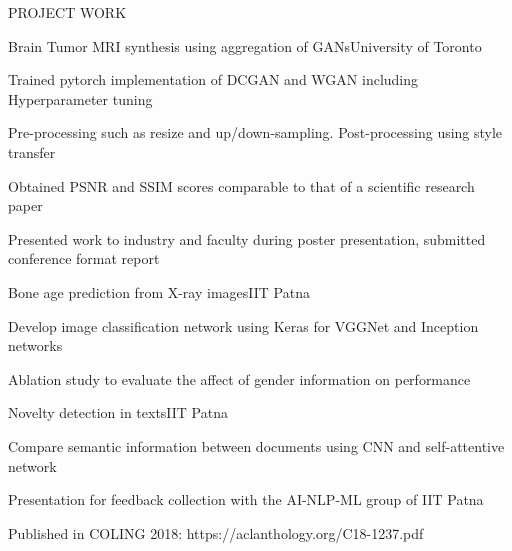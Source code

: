 \documentclass{resume}
\begin{document}
  \begin{rSection}{PROJECT WORK}

    \begin{rSubsection}{Brain Tumor MRI synthesis using aggregation of GANs}{University of Toronto}{}{}
      \item Trained pytorch implementation of DCGAN and WGAN including Hyperparameter tuning
      \item Pre-processing such as resize and up/down-sampling. Post-processing using style transfer
      \item Obtained PSNR and SSIM scores comparable to that of a scientific research paper
      \item Presented work to industry and faculty during poster presentation, submitted conference format report
    \end{rSubsection}
  
    \begin{rSubsection}{Bone age prediction from X-ray images}{IIT Patna}{}{}
      \item Develop image classification network using Keras for VGGNet and Inception networks
      \item Ablation study to evaluate the affect of gender information on performance
    \end{rSubsection}

    \begin{rSubsection}{Novelty detection in texts}{IIT Patna}{}{}
      \item Compare semantic information between documents using CNN and self-attentive network
      \item Presentation for feedback collection with the AI-NLP-ML group of IIT Patna
      \item Published in COLING 2018: https://aclanthology.org/C18-1237.pdf
    \end{rSubsection}


  \end{rSection}
  
\end{document}
